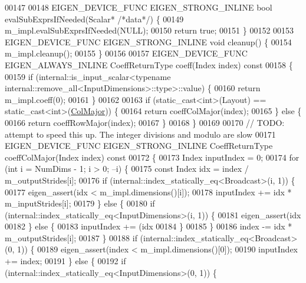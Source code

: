 \begin{DoxyCode}
00147 
00148   EIGEN\_DEVICE\_FUNC EIGEN\_STRONG\_INLINE \textcolor{keywordtype}{bool} evalSubExprsIfNeeded(Scalar* \textcolor{comment}{/*data*/}) \{
00149     m\_impl.evalSubExprsIfNeeded(NULL);
00150     \textcolor{keywordflow}{return} \textcolor{keyword}{true};
00151   \}
00152 
00153   EIGEN\_DEVICE\_FUNC EIGEN\_STRONG\_INLINE \textcolor{keywordtype}{void} cleanup() \{
00154     m\_impl.cleanup();
00155   \}
00156 
00157   EIGEN\_DEVICE\_FUNC EIGEN\_ALWAYS\_INLINE CoeffReturnType coeff(Index index)\textcolor{keyword}{ const}
00158 \textcolor{keyword}{  }\{
00159     \textcolor{keywordflow}{if} (internal::is\_input\_scalar<\textcolor{keyword}{typename} internal::remove\_all<InputDimensions>::type>::value) \{
00160       \textcolor{keywordflow}{return} m\_impl.coeff(0);
00161     \}
00162 
00163     \textcolor{keywordflow}{if} (static\_cast<int>(Layout) == static\_cast<int>(\hyperlink{group__enums_ggaacded1a18ae58b0f554751f6cdf9eb13a0cbd4bdd0abcfc0224c5fcb5e4f6669a}{ColMajor})) \{
00164       \textcolor{keywordflow}{return} coeffColMajor(index);
00165     \} \textcolor{keywordflow}{else} \{
00166       \textcolor{keywordflow}{return} coeffRowMajor(index);
00167     \}
00168   \}
00169 
00170   \textcolor{comment}{// TODO: attempt to speed this up. The integer divisions and modulo are slow}
00171   EIGEN\_DEVICE\_FUNC EIGEN\_STRONG\_INLINE CoeffReturnType coeffColMajor(Index index)\textcolor{keyword}{ const}
00172 \textcolor{keyword}{  }\{
00173     Index inputIndex = 0;
00174     \textcolor{keywordflow}{for} (\textcolor{keywordtype}{int} i = NumDims - 1; i > 0; --i) \{
00175       \textcolor{keyword}{const} Index idx = index / m\_outputStrides[i];
00176       \textcolor{keywordflow}{if} (internal::index\_statically\_eq<Broadcast>(i, 1)) \{
00177         eigen\_assert(idx < m\_impl.dimensions()[i]);
00178         inputIndex += idx * m\_inputStrides[i];
00179       \} \textcolor{keywordflow}{else} \{
00180         \textcolor{keywordflow}{if} (internal::index\_statically\_eq<InputDimensions>(i, 1)) \{
00181           eigen\_assert(idx %
00182         \} \textcolor{keywordflow}{else} \{
00183           inputIndex += (idx %
00184         \}
00185       \}
00186       index -= idx * m\_outputStrides[i];
00187     \}
00188     \textcolor{keywordflow}{if} (internal::index\_statically\_eq<Broadcast>(0, 1)) \{
00189       eigen\_assert(index < m\_impl.dimensions()[0]);
00190       inputIndex += index;
00191     \} \textcolor{keywordflow}{else} \{
00192       \textcolor{keywordflow}{if} (internal::index\_statically\_eq<InputDimensions>(0, 1)) \{

\end{DoxyCode}
